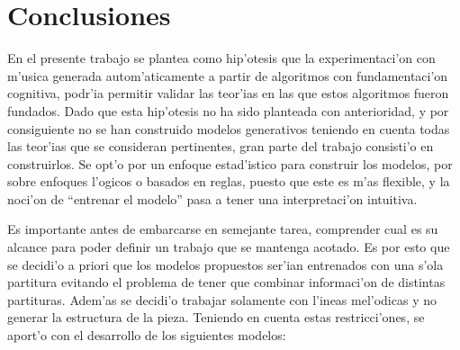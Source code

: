 \chapter{Conclusiones}
En el presente trabajo se plantea como hip'otesis que la experimentaci'on con m'usica generada autom'aticamente a partir de 
algoritmos con fundamentaci'on cognitiva, podr'ia permitir validar las teor'ias en las que estos algoritmos fueron fundados. 
Dado que esta hip'otesis no ha sido planteada con anterioridad, y por consiguiente no se han construido modelos generativos 
teniendo en cuenta todas las teor'ias que se consideran pertinentes, gran parte del trabajo consisti'o en construirlos. 
Se opt'o por un enfoque estad'istico para construir los modelos, por sobre enfoques l'ogicos o basados en reglas, puesto 
que este es m'as flexible, y la noci'on de ``entrenar el modelo'' pasa a tener una interpretaci'on intuitiva. 

Es importante antes de embarcarse en semejante tarea, comprender cual es su alcance para poder definir un trabajo que se mantenga 
acotado. Es por esto que se decidi'o a priori que los modelos propuestos ser'ian entrenados con una s'ola partitura evitando
el problema de tener que combinar informaci'on de distintas partituras. Adem'as se decidi'o trabajar solamente con l'ineas 
mel'odicas y no generar la estructura de la pieza.
Teniendo en cuenta estas restricci'ones, se aport'o con el desarrollo de los siguientes modelos:

